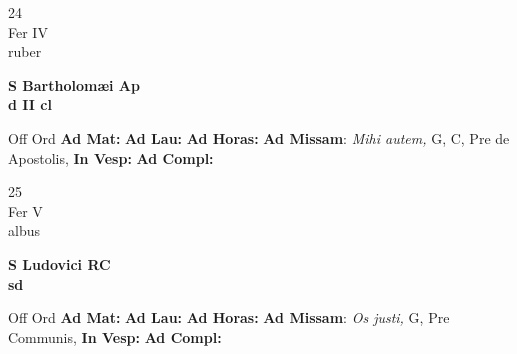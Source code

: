 \documentclass[10pt, openany]{book}
\begin{document}
        \begin{center}
            \begin{minipage}{3.5in}
                \vspace{2em}
                \begin{minipage}{0.5in}
                    {\Huge 24} \\
                    {\normalsize Fer IV} \\
                    {\normalsize ruber}
                \end{minipage}
                \begin{minipage}{3.0in}
                    \textbf{ \large S Bartholomæi Ap \\
                    \textnormal{\normalsize d II cl}} \\ 
                \end{minipage}
                \begin{justify}Off Ord
                    \textbf{Ad Mat: }
                    \textbf{Ad Lau: }
                    \textbf{Ad Horas: }\textbf{Ad Missam}: \textit{Mihi autem,} G, C, Pre de Apostolis,  
                    \textbf{In Vesp: }
                    \textbf{Ad Compl: }
                \end{justify}
            \end{minipage}
        \end{center}
    
        \begin{center}
            \begin{minipage}{3.5in}
                \vspace{2em}
                \begin{minipage}{0.5in}
                    {\Huge 25} \\
                    {\normalsize Fer V} \\
                    {\normalsize albus}
                \end{minipage}
                \begin{minipage}{3.0in}
                    \textbf{ \large S Ludovici RC \\
                    \textnormal{\normalsize sd}} \\ 
                \end{minipage}
                \begin{justify}Off Ord
                    \textbf{Ad Mat: }
                    \textbf{Ad Lau: }
                    \textbf{Ad Horas: }\textbf{Ad Missam}: \textit{Os justi,} G, Pre Communis,  
                    \textbf{In Vesp: }
                    \textbf{Ad Compl: }
                \end{justify}
            \end{minipage}
        \end{center}
    
\end{document}
